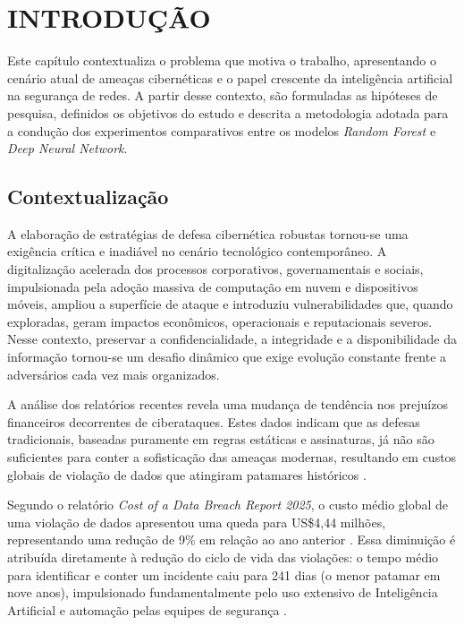 \chapter{INTRODUÇÃO}

Este capítulo contextualiza o problema que motiva o trabalho, apresentando o cenário atual de ameaças cibernéticas e o papel crescente da inteligência artificial na segurança de redes. A partir desse contexto, são formuladas as hipóteses de pesquisa, definidos os objetivos do estudo e descrita a metodologia adotada para a condução dos experimentos comparativos entre os modelos \textit{Random Forest} e \textit{Deep Neural Network}.

\section{Contextualização}

A elaboração de estratégias de defesa cibernética robustas tornou-se uma exigência crítica e inadiável no cenário tecnológico contemporâneo. A digitalização acelerada dos processos corporativos, governamentais e sociais, impulsionada pela adoção massiva de computação em nuvem e dispositivos móveis, ampliou a superfície de ataque e introduziu vulnerabilidades que, quando exploradas, geram impactos econômicos, operacionais e reputacionais severos. Nesse contexto, preservar a confidencialidade, a integridade e a disponibilidade da informação tornou-se um desafio dinâmico que exige evolução constante frente a adversários cada vez mais organizados.

A análise dos relatórios recentes revela uma mudança de tendência nos prejuízos financeiros decorrentes de ciberataques. Estes dados indicam que as defesas tradicionais, baseadas puramente em regras estáticas e assinaturas, já não são suficientes para conter a sofisticação das ameaças modernas, resultando em custos globais de violação de dados que atingiram patamares históricos \parencite[4]{IBM2024}.

Segundo o relatório \textit{Cost of a Data Breach Report 2025}, o custo médio global de uma violação de dados apresentou uma queda para US\$4,44 milhões, representando uma redução de 9\% em relação ao ano anterior \parencite[3]{IBM2025}. Essa diminuição é atribuída diretamente à redução do ciclo de vida das violações: o tempo médio para identificar e conter um incidente caiu para 241 dias (o menor patamar em nove anos), impulsionado fundamentalmente pelo uso extensivo de Inteligência Artificial e automação pelas equipes de segurança \parencite[7]{IBM2025}.

